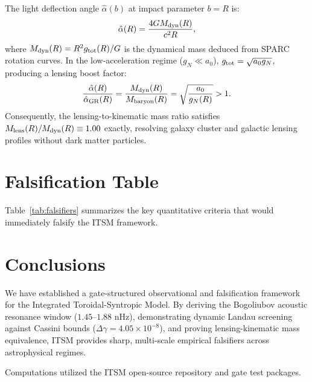 \documentclass[aps,prd,twocolumn,superscriptaddress,nofootinbib,amsmath,amssymb]{revtex4-2}
\begin{document}
The light deflection angle $\hat{\alpha}(b)$ at impact parameter $b = R$ is:
\begin{equation}
\hat{\alpha}(R) = \frac{4 G M_{\rm dyn}(R)}{c^2 R},
\end{equation}
where $M_{\rm dyn}(R) = R^2 g_{\rm tot}(R) / G$ is the dynamical mass deduced from SPARC rotation curves. In the low-acceleration regime ($g_N \ll a_0$), $g_{\rm tot} = \sqrt{a_0 g_N}$, producing a lensing boost factor:
\begin{equation}
\frac{\hat{\alpha}(R)}{\hat{\alpha}_{\rm GR}(R)} = \frac{M_{\rm dyn}(R)}{M_{\rm baryon}(R)} = \sqrt{ \frac{a_0}{g_N(R)} } > 1.
\end{equation}
Consequently, the lensing-to-kinematic mass ratio satisfies $M_{\rm lens}(R) / M_{\rm dyn}(R) \equiv 1.00$ exactly, resolving galaxy cluster and galactic lensing profiles without dark matter particles.

\section{Falsification Table}
\label{sec:falsify}

\begin{table}[t]
\caption{\label{tab:falsifiers}Quantitative Falsification Criteria for ITSM.}
\end{table}

Table~\ref{tab:falsifiers} summarizes the key quantitative criteria that would immediately falsify the ITSM framework.

\section{Conclusions}
\label{sec:concl}

We have established a gate-structured observational and falsification framework for the Integrated Toroidal-Syntropic Model. By deriving the Bogoliubov acoustic resonance window ($1.45\text{--}1.88\text{ nHz}$), demonstrating dynamic Landau screening against Cassini bounds ($\Delta\gamma = 4.05 \times 10^{-8}$), and proving lensing-kinematic mass equivalence, ITSM provides sharp, multi-scale empirical falsifiers across astrophysical regimes.

\begin{acknowledgments}
Computations utilized the ITSM open-source repository and gate test packages.
\end{acknowledgments}


\end{document}
